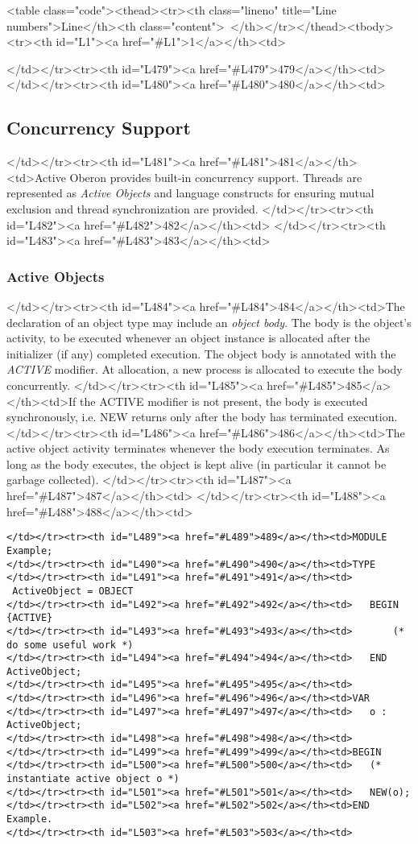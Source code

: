 <table class="code"><thead><tr><th class="lineno" title="Line numbers">Line</th><th class="content"> </th></tr></thead><tbody><tr><th id="L1"><a href="#L1">1</a></th><td>\documentclass[a4paper,11pt]{article}
\begin{document}
</td></tr><tr><th id="L479"><a href="#L479">479</a></th><td>
</td></tr><tr><th id="L480"><a href="#L480">480</a></th><td>\subsection{Concurrency Support}
</td></tr><tr><th id="L481"><a href="#L481">481</a></th><td>Active Oberon provides built-in concurrency support. Threads are represented as {\em Active Objects} and language constructs for ensuring mutual exclusion and thread synchronization are provided.
</td></tr><tr><th id="L482"><a href="#L482">482</a></th><td>
</td></tr><tr><th id="L483"><a href="#L483">483</a></th><td>\subsubsection{Active Objects}
</td></tr><tr><th id="L484"><a href="#L484">484</a></th><td>The declaration of an object type may include an \emph{object body}. The body is the object's activity, to be executed whenever an object instance is allocated after the initializer (if any) completed execution. The object body is annotated with the \emph{ACTIVE} modifier. At allocation, a new process is allocated to execute the body concurrently.
</td></tr><tr><th id="L485"><a href="#L485">485</a></th><td>If the ACTIVE modifier is not present, the body is executed synchronously, i.e. NEW returns only after the body has terminated execution.
</td></tr><tr><th id="L486"><a href="#L486">486</a></th><td>The active object activity terminates whenever the body execution terminates. As long as the body executes, the object is kept alive (in particular it cannot be garbage collected).
</td></tr><tr><th id="L487"><a href="#L487">487</a></th><td>
</td></tr><tr><th id="L488"><a href="#L488">488</a></th><td>\begin{lstlisting}[language=Oberon,frame=none,caption=Example of an active object]
</td></tr><tr><th id="L489"><a href="#L489">489</a></th><td>MODULE Example;
</td></tr><tr><th id="L490"><a href="#L490">490</a></th><td>TYPE
</td></tr><tr><th id="L491"><a href="#L491">491</a></th><td>   ActiveObject = OBJECT
</td></tr><tr><th id="L492"><a href="#L492">492</a></th><td>   BEGIN {ACTIVE}
</td></tr><tr><th id="L493"><a href="#L493">493</a></th><td>       (* do some useful work *)
</td></tr><tr><th id="L494"><a href="#L494">494</a></th><td>   END ActiveObject;
</td></tr><tr><th id="L495"><a href="#L495">495</a></th><td>
</td></tr><tr><th id="L496"><a href="#L496">496</a></th><td>VAR
</td></tr><tr><th id="L497"><a href="#L497">497</a></th><td>   o : ActiveObject;
</td></tr><tr><th id="L498"><a href="#L498">498</a></th><td>
</td></tr><tr><th id="L499"><a href="#L499">499</a></th><td>BEGIN
</td></tr><tr><th id="L500"><a href="#L500">500</a></th><td>   (* instantiate active object o *)
</td></tr><tr><th id="L501"><a href="#L501">501</a></th><td>   NEW(o);
</td></tr><tr><th id="L502"><a href="#L502">502</a></th><td>END Example.
</td></tr><tr><th id="L503"><a href="#L503">503</a></th><td>\end{lstlisting}
\end{document}
